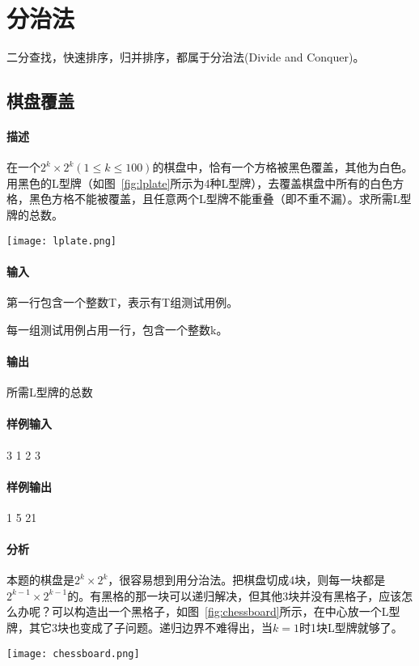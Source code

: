 \chapter{分治法}

二分查找，快速排序，归并排序，都属于分治法(Divide and Conquer)。

\section{棋盘覆盖} %
\subsubsection{描述}
在一个$2^k \times 2^k(1 \leq k \leq 100)$的棋盘中，恰有一个方格被黑色覆盖，其他为白色。用黑色的L型牌（如图~\ref{fig:lplate}所示为4种L型牌），去覆盖棋盘中所有的白色方格，黑色方格不能被覆盖，且任意两个L型牌不能重叠（即不重不漏）。求所需L型牌的总数。

\begin{center}
\texttt{[image: lplate.png]}\\
\label{fig:lplate}
\end{center}

\subsubsection{输入}
第一行包含一个整数T，表示有T组测试用例。

每一组测试用例占用一行，包含一个整数k。

\subsubsection{输出}
所需L型牌的总数

\subsubsection{样例输入}
\begin{Code}
3
1
2
3
\end{Code}

\subsubsection{样例输出}
\begin{Code}
1
5
21
\end{Code}

\subsubsection{分析}
本题的棋盘是$2^k \times 2^k$，很容易想到用分治法。把棋盘切成4块，则每一块都是$2^{k-1} \times 2^{k-1}$的。有黑格的那一块可以递归解决，但其他3块并没有黑格子，应该怎么办呢？可以构造出一个黑格子，如图~\ref{fig:chessboard}所示，在中心放一个L型牌，其它3块也变成了子问题。递归边界不难得出，当$k=1$时1块L型牌就够了。
\begin{center}
\texttt{[image: chessboard.png]}\\
\label{fig:chessboard}
\end{center}

